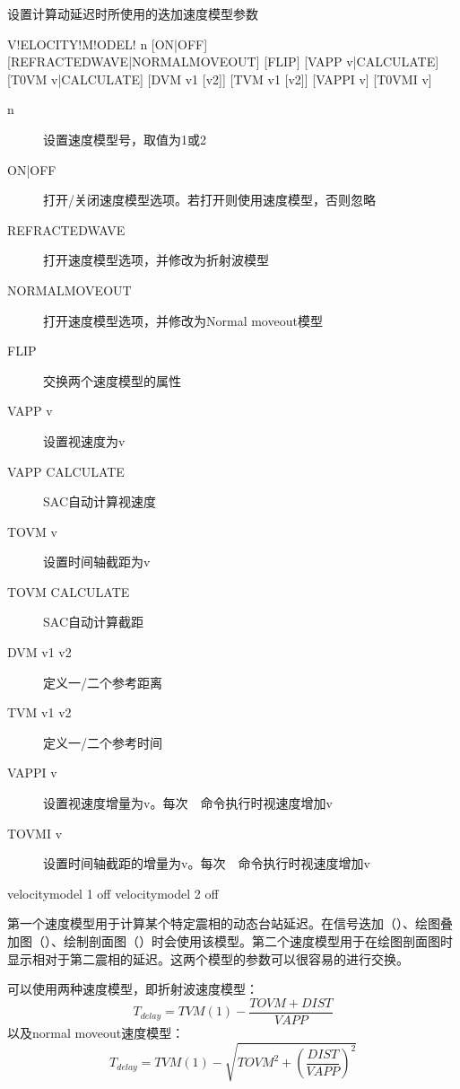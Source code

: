 \label{sss:velocitymodel}

设置计算动延迟时所使用的迭加速度模型参数

\begin{SACSTX}
    V!ELOCITY!M!ODEL! n [ON|OFF] [REFRACTEDWAVE|NORMALMOVEOUT]
        [FLIP] [VAPP v|CALCULATE] [T0VM v|CALCULATE]
        [DVM v1 [v2]] [TVM v1 [v2]] [VAPPI v] [T0VMI v]
\end{SACSTX}

\begin{description}
\item [n] 设置速度模型号，取值为1或2
\item [ON|OFF] 打开/关闭速度模型选项。若打开则使用速度模型，否则忽略
\item [REFRACTEDWAVE] 打开速度模型选项，并修改为折射波模型
\item [NORMALMOVEOUT] 打开速度模型选项，并修改为Normal moveout模型
\item [FLIP] 交换两个速度模型的属性
\item [VAPP v] 设置视速度为v
\item [VAPP CALCULATE] SAC自动计算视速度
\item [TOVM v] 设置时间轴截距为v
\item [TOVM CALCULATE] SAC自动计算截距
\item [DVM v1 v2] 定义一/二个参考距离
\item [TVM v1 v2] 定义一/二个参考时间
\item [VAPPI v] 设置视速度增量为v。每次~~命令执行时视速度增加v
\item [TOVMI v] 设置时间轴截距的增量为v。每次~~命令执行时视速度增加v
\end{description}

\begin{SACDFT}
velocitymodel 1 off
velocitymodel 2 off
\end{SACDFT}

第一个速度模型用于计算某个特定震相的动态台站延迟。在信号迭加（）、绘图叠加图（）、绘制剖面图（）时会使用该模型。第二个速度模型用于在绘图剖面图时显示相对于第二震相的延迟。这两个模型的参数可以很容易的进行交换。

可以使用两种速度模型，即折射波速度模型：
\[ T_{delay} = TVM(1) - \frac{TOVM+DIST}{VAPP} \]
以及normal moveout速度模型：
\[ T_{delay} = TVM(1) - \sqrt{TOVM^2 + (\frac{DIST}{VAPP})^2} \]

